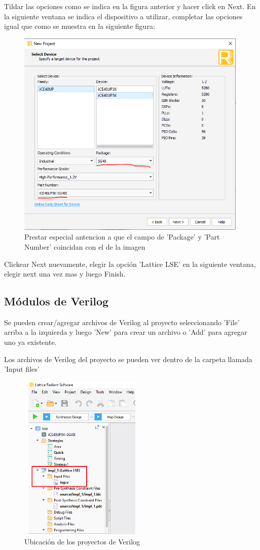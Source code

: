 \documentclass{article}
\begin{document}
	Tildar las opciones como se indica en la figura anterior y hacer click en Next.
	En la siguiente ventana se indica el dispositivo a utilizar, completar las opciones igual que como se muestra en la siguiente figura:
	\begin{figure}[H]
	\centering
	\includegraphics[height=10cm,width=0.8\linewidth]{Imagenes/Dispositivo.png}
	\caption{Prestar especial antencion a que el campo de 'Package' y 'Part Number' coincidan con el de la imagen }
	\end{figure}
	Clickear Next nuevamente, elegir la opción 'Lattice LSE' en la siguiente ventana, elegir next una vez mas y luego Finish.
	

\subsection{Módulos de Verilog}
Se pueden crear/agregar archivos de Verilog al proyecto seleccionando 'File' arriba a la izquierda y luego 'New' para crear un archivo o 'Add' para agregar uno ya existente.

Los archivos de Verilog del proyecto se pueden ver dentro de la carpeta llamada 'Input files'
	\begin{figure}[H]
	\centering
	\includegraphics[height=8cm,width=6cm]{Imagenes/VerilogArch.png}
	\caption{Ubicación de los proyectos de Verilog}
	\end{figure}
\end{document}
